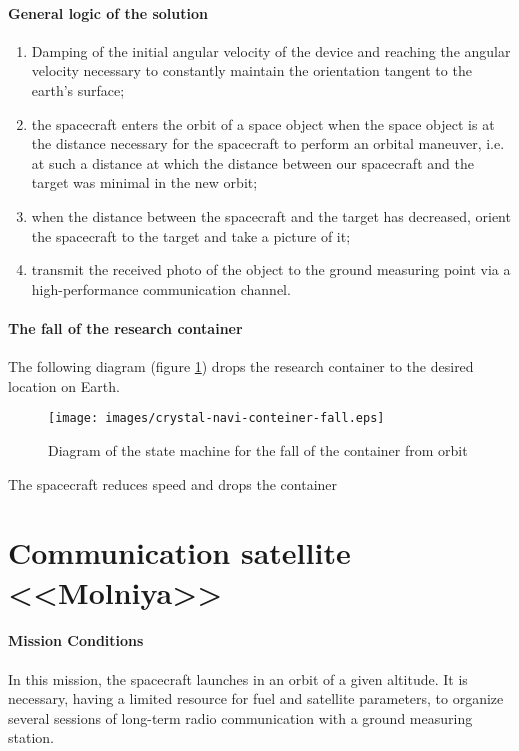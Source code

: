 \documentclass[12pt,a4paper]{article}
\begin{document}
\clearpage
\paragraph{General logic of the solution} 

\begin{enumerate}
\item Damping of the initial angular velocity of the device and reaching the angular velocity necessary to constantly maintain the orientation tangent to the earth's surface;
\item the spacecraft enters the orbit of a space object when the space object is at the distance necessary for the spacecraft to perform an orbital maneuver, i.e. at such a distance at which the distance between our spacecraft and the target was minimal in the new orbit;
\item when the distance between the spacecraft and the target has decreased, orient the spacecraft to the target and take a picture of it;
\item transmit the received photo of the object to the ground measuring point via a high-performance communication channel.
\end{enumerate}

\paragraph{The fall of the research container} The following diagram (figure \ref{Pic:Сrystal-navi-conteiner-fall-en}) drops the research container to the desired location on Earth.

\begin{figure}[tbh]
  \begin{center}
    \texttt{[image: images/crystal-navi-conteiner-fall.eps]}
    \caption{Diagram of the state machine for the fall of the container from orbit}
    \label{Pic:Сrystal-navi-conteiner-fall-en}
  \end{center}
\end{figure}

The spacecraft reduces speed and drops the container

\section{Communication satellite <<Molniya>>}

\paragraph{Mission Conditions} In this mission, the spacecraft launches in an orbit of a given altitude. It is necessary, having a limited resource for fuel and satellite parameters, to organize several sessions of long-term radio communication with a ground measuring station.
\end{document}
